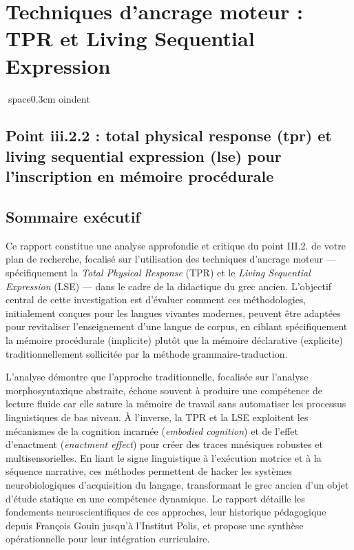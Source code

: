 

\section{Techniques d'ancrage moteur : TPR et Living Sequential Expression}
space{0.3cm}
oindent



\subsection{Point iii.2.2 : total physical response (tpr) et living sequential expression (lse) pour l'inscription en mémoire procédurale}



\subsection{Sommaire exécutif}

Ce rapport constitue une analyse approfondie et critique du point III.2.\cite{III-2-2-ref2} de votre
plan de recherche, focalisé sur l'utilisation des techniques d'ancrage moteur — spécifiquement la
\textit{Total Physical Response} (TPR) et le \textit{Living Sequential Expression} (LSE) — dans le
cadre de la didactique du grec ancien. L'objectif central de cette investigation est d'évaluer
comment ces méthodologies, initialement conçues pour les langues vivantes modernes, peuvent être
adaptées pour revitaliser l'enseignement d'une langue de corpus, en ciblant spécifiquement la
mémoire procédurale (implicite) plutôt que la mémoire déclarative (explicite) traditionnellement
sollicitée par la méthode grammaire-traduction.

L'analyse démontre que l'approche traditionnelle, focalisée sur l'analyse morphosyntaxique
abstraite, échoue souvent à produire une compétence de lecture fluide car elle sature la mémoire de
travail sans automatiser les processus linguistiques de bas niveau. À l'inverse, la TPR et la LSE
exploitent les mécanismes de la cognition incarnée (\textit{embodied cognition}) et de l'effet
d'enactment (\textit{enactment effect}) pour créer des traces mnésiques robustes et
multisensorielles. En liant le signe linguistique à l'exécution motrice et à la séquence narrative,
ces méthodes permettent de \og hacker\fg{} les systèmes neurobiologiques d'acquisition du langage,
transformant le grec ancien d'un objet d'étude statique en une compétence dynamique. Le rapport
détaille les fondements neuroscientifiques de ces approches, leur historique pédagogique depuis
François Gouin jusqu'à l'Institut Polis, et propose une synthèse opérationnelle pour leur
intégration curriculaire.

